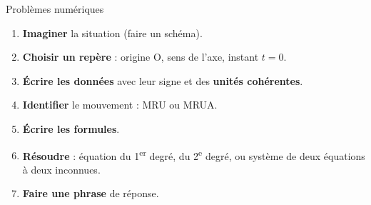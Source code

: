 \documentclass[10pt,a4paper]{article}
\begin{document}
\vspace{2mm}
\begin{bloc}{Problèmes numériques}
\begin{enumerate}[label=\textbf{\arabic*.},leftmargin=7mm,itemsep=2pt,topsep=2pt]
\item \textbf{Imaginer} la situation (faire un schéma).
\item \textbf{Choisir un repère} : origine O, sens de l'axe, instant $t=0$.
\item \textbf{Écrire les données} avec leur signe et des \textbf{unités cohérentes}.
\item \textbf{Identifier} le mouvement : MRU ou MRUA.
\item \textbf{Écrire les formules}.
\item \textbf{Résoudre} : équation du 1\textsuperscript{er} degré, du 2\textsuperscript{e} degré, ou système de deux équations à deux inconnues.
\item \textbf{Faire une phrase} de réponse.
\end{enumerate}
\end{bloc}
\end{document}
